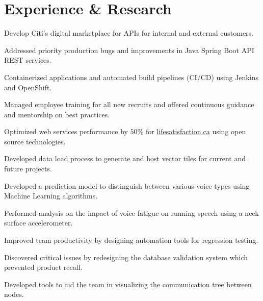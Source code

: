 \documentclass[]{sumbal-resume}
\begin{document}
\section{Experience \& Research}

\begin{tightemize}
\item Develop Citi's digital marketplace for APIs for internal and external customers.
\item Addressed priority production bugs and improvements in Java Spring Boot API REST services. 
\item Containerized applications and automated build pipelines (CI/CD) using Jenkins and OpenShift.
\item Managed employee training for all new recruits and offered continuous guidance and mentorship on best practices.
\end{tightemize}
	
\begin{tightemize}
\item Optimized web services performance by $50 \%$ for \href{http://lifesatisfaction.ca}{lifesatisfaction.ca} using open source technologies.
\item Developed data load process to generate and host vector tiles for current and future projects.
\end{tightemize}


\begin{tightemize}
\item Developed a prediction model to distinguish between various voice types using Machine Learning algorithms. 
\item Performed analysis on the impact of voice fatigue on running speech using a neck surface accelerometer.
\end{tightemize}


\begin{tightemize}
\item Improved team productivity by designing automation tools for regression testing. 
\item Discovered critical issues by redesigning the database validation system which prevented product recall.
\item Developed tools to aid the team in visualizing the communication tree between nodes.
\end{tightemize}
\end{document}
